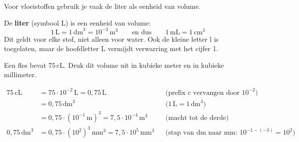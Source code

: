 \documentclass{ximera}
\begin{document}
Voor vloeistoffen gebruik je vaak de liter als eenheid van volume.

\begin{definition}[title={Liter}]\nl
    De \textbf{liter} (symbool L) is een eenheid van volume:
    \[ 1 \, \mathrm{L} = 1 \, \mathrm{dm}^{3} = 10^{-3} \, \mathrm{m}^{3} \qquad \text{en dus} \qquad 1 \, \mathrm{mL} = 1 \, \mathrm{cm}^{3} \]
    Dit geldt voor elke stof, niet alleen voor water. Ook de kleine letter l is toegelaten, maar de hoofdletter L vermijdt verwarring met het cijfer 1.
\end{definition}

\begin{example}[foldable=true,title={Voorbeeld: centiliter naar kubieke meter en kubieke millimeter}]\nl
    Een fles bevat $75 \, \mathrm{cL}$. Druk dit volume uit in kubieke meter en in kubieke millimeter.

    \begin{solution}\nl
        \begin{align*}
            75 \, \mathrm{cL} &= 75 \cdot 10^{-2} \, \mathrm{L} = 0{,}75 \, \mathrm{L} && \text{(prefix c vervangen door $10^{-2}$)}\\
            &= 0{,}75 \, \mathrm{dm}^{3} && \text{($1 \, \mathrm{L} = 1 \, \mathrm{dm}^{3}$)}\\
            &= 0{,}75 \cdot (10^{-1} \, \mathrm{m})^{3} = \boxed{7{,}5 \cdot 10^{-4} \, \mathrm{m}^{3}} && \text{(macht tot de derde)}\\
            0{,}75 \, \mathrm{dm}^{3} &= 0{,}75 \cdot (10^{2})^{3} \, \mathrm{mm}^{3} = \boxed{7{,}5 \cdot 10^{5} \, \mathrm{mm}^{3}} && \text{(stap van dm naar mm: $10^{-1-(-3)} = 10^{2}$)}
        \end{align*}
    \end{solution}
\end{example}
\end{document}
